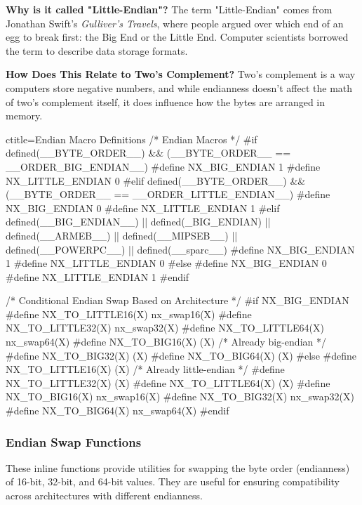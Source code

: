 \begin{NexMainBox}
	\begin{NexMainBox}
		\textbf{Why is it called "Little-Endian"?}
		The term "Little-Endian" comes from Jonathan Swift’s \textit{Gulliver’s Travels}, where people argued over which end of an egg to break first: the Big End or the Little End. Computer scientists borrowed the term to describe data storage formats.
	\end{NexMainBox}
	\begin{NexMainBox}
		\textbf{How Does This Relate to Two’s Complement?}
		Two’s complement is a way computers store negative numbers, and while endianness doesn’t affect the math of two’s complement itself, it does influence how the bytes are arranged in memory.
		\begin{NexListDark}
		\end{NexListDark}
	\end{NexMainBox}
\end{NexMainBox}

\begin{NexCodeBox}{c}{title={Endian Macro Definitions}}
/* Endian Macros */
#if defined(__BYTE_ORDER__) && (__BYTE_ORDER__ == __ORDER_BIG_ENDIAN__)
	#define NX_BIG_ENDIAN 1
	#define NX_LITTLE_ENDIAN 0
#elif defined(__BYTE_ORDER__) && (__BYTE_ORDER__ == __ORDER_LITTLE_ENDIAN__)
	#define NX_BIG_ENDIAN 0
	#define NX_LITTLE_ENDIAN 1
#elif defined(__BIG_ENDIAN__) || defined(_BIG_ENDIAN) || defined(__ARMEB__) || defined(__MIPSEB__) || defined(__POWERPC__) || defined(__sparc__)
	#define NX_BIG_ENDIAN 1
	#define NX_LITTLE_ENDIAN 0
#else
	#define NX_BIG_ENDIAN 0
	#define NX_LITTLE_ENDIAN 1
#endif

/* Conditional Endian Swap Based on Architecture */
#if NX_BIG_ENDIAN
	#define NX_TO_LITTLE16(X) nx_swap16(X)
	#define NX_TO_LITTLE32(X) nx_swap32(X)
	#define NX_TO_LITTLE64(X) nx_swap64(X)
	#define NX_TO_BIG16(X) (X)  /* Already big-endian */
	#define NX_TO_BIG32(X) (X)
	#define NX_TO_BIG64(X) (X)
#else
	#define NX_TO_LITTLE16(X) (X)  /* Already little-endian */
	#define NX_TO_LITTLE32(X) (X)
	#define NX_TO_LITTLE64(X) (X)
	#define NX_TO_BIG16(X) nx_swap16(X)
	#define NX_TO_BIG32(X) nx_swap32(X)
	#define NX_TO_BIG64(X) nx_swap64(X)
#endif
\end{NexCodeBox}

\subsubsection{Endian Swap Functions}
\label{Endian Swap Functions}
\begin{NexMainBox}
	\begin{NexMainBox}
		These inline functions provide utilities for swapping the byte order (endianness) of 16-bit, 32-bit, and 64-bit values. They are useful for ensuring compatibility across architectures with different endianness.
	\end{NexMainBox}
\end{NexMainBox}

